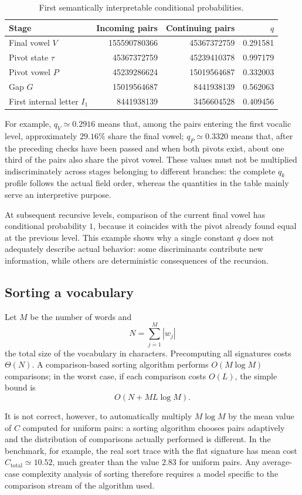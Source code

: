 \documentclass[11pt,a4paper]{article}
\theoremstyle{definition}
\theoremstyle{remark}
\begin{document}
\begin{table}[htbp]
\centering
\caption{First semantically interpretable conditional probabilities.}
\label{tab:q-semantiche}
\begin{tabular}{lrrr}
\toprule
Stage & Incoming pairs & Continuing pairs & $q$ \\
\midrule
Final vowel $V$ & 155590780366 & 45367372759 & 0.291581 \\
Pivot state $\tau$ & 45367372759 & 45239410378 & 0.997179 \\
Pivot vowel $P$ & 45239286624 & 15019564687 & 0.332003 \\
Gap $G$ & 15019564687 & 8441938139 & 0.562063 \\
First internal letter $I_1$ & 8441938139 & 3456604528 & 0.409456 \\
\bottomrule
\end{tabular}
\end{table}

For example, $q_V\simeq0.2916$ means that, among the pairs entering the first vocalic level, approximately $29.16\%$ share the final vowel; $q_P\simeq0.3320$ means that, after the preceding checks have been passed and when both pivots exist, about one third of the pairs also share the pivot vowel. These values must not be multiplied indiscriminately across stages belonging to different branches: the complete $q_k$ profile follows the actual field order, whereas the quantities in the table mainly serve an interpretive purpose.

At subsequent recursive levels, comparison of the current final vowel has conditional probability $1$, because it coincides with the pivot already found equal at the previous level. This example shows why a single constant $q$ does not adequately describe actual behavior: some discriminants contribute new information, while others are deterministic consequences of the recursion.

\subsection{Sorting a vocabulary}

Let $M$ be the number of words and
\[
  N=\sum_{j=1}^{M}|w_j|
\]
the total size of the vocabulary in characters. Precomputing all signatures costs $\Theta(N)$. A comparison-based sorting algorithm performs $O(M\log M)$ comparisons; in the worst case, if each comparison costs $O(L)$, the simple bound is
\[
  O(N+ML\log M).
\]

It is not correct, however, to automatically multiply $M\log M$ by the mean value of $C$ computed for uniform pairs: a sorting algorithm chooses pairs adaptively and the distribution of comparisons actually performed is different. In the benchmark, for example, the real sort trace with the flat signature has mean cost $C_{\mathrm{total}}\simeq10.52$, much greater than the value $2.83$ for uniform pairs. Any average-case complexity analysis of sorting therefore requires a model specific to the comparison stream of the algorithm used.
\end{document}
